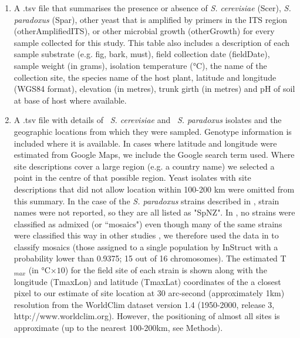 \documentclass[12pt]{article}
\begin{document}
\begin{enumerate}
\item \label{itm:presabsdata.tsv} A .tsv file that summarises the presence or absence of  \textit{S. cerevisiae} (Scer), \textit{S. paradoxus} (Spar), other yeast that is amplified by primers in the ITS region (otherAmplifiedITS), or other microbial growth (otherGrowth) for every sample collected for this study. This table also includes a description of each sample substrate (e.g. fig, bark, must), field collection date (fieldDate), sample weight (in grams), isolation temperature (\si{\degreeCelsius}), the name of the collection site, the species name of the host plant, latitude and longitude (WGS84 format), elevation (in metres), trunk girth (in metres) and pH of soil at base of host where available. 

\item \label{itm:manystudies.tsv} A .tsv file with details of \cerinms\  \textit{S. cerevisiae} and \parinms\ \textit{S. paradoxus} isolates and the geographic locations from which they were sampled. Genotype information is included where it is available. In cases where latitude and longitude were estimated from Google Maps, we include the Google search term used. Where site descriptions cover a large region (e.g. a country name) we selected a point in the centre of that possible region. Yeast isolates with site descriptions that did not allow location within 100-200 km were omitted from this summary. In the case of the \textit{S. paradoxus} strains described in \citet{zhang_saccharomyces_2010}, strain names were not reported, so they are all listed as "SpNZ". In \citet{cromie_genomic_2013}, no strains were classified as admixed (or ``mosaics") even though many of the same strains were classified this way in other studies \citep{liti_population_2009}, we therefore used the data in \citealp{cromie_genomic_2013} to classify mosaics (those assigned to a single population by InStruct with a probability lower than 0.9375; 15 out of 16 chromosomes). The estimated T$_{max}$ (in \si{\degreeCelsius}$\times10$) for the field site of each strain is shown along with the longitude (TmaxLon) and latitude (TmaxLat) coordinates of the a closest pixel to our estimate of site location at 30 arc-second (approximately 1km) resolution from the WorldClim dataset version 1.4 (1950-2000, release 3, http://www.worldclim.org). However, the positioning of almost all sites is approximate (up to the nearest 100-200km, see Methods).


\end{enumerate}

\clearpage
\end{document}
